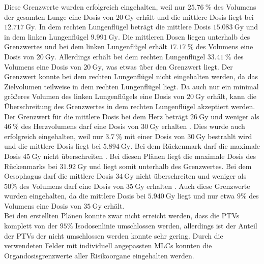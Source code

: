 Diese Grenzwerte wurden erfolgreich eingehalten, weil nur $\SI{25.76}{\percent}$ des Volumens der gesamten Lunge eine Dosis von $\SI{20}{\gray}$
erhält und die mittlere Dosis liegt bei $\SI{12.717}{\gray}$. In dem rechten Lungenflügel beträgt die mittlere Dosis $\SI{15.083}{\gray}$
und in dem linken Lungenflügel $\SI{9.991}{\gray}$. Die mittleren Dosen liegen unterhalb des Grenzwertes und bei dem linken Lungenflügel
erhält $\SI{17.17}{\percent}$ des Volumens eine Dosis von $\SI{20}{\gray}$. Allerdings erhält bei dem rechten Lungenflügel $\SI{33.41}{\percent}$
des Volumens eine Dosis von $\SI{20}{\gray}$, was etwas über den Grenzwert liegt. Der Grenzwert konnte bei dem rechten Lungenflügel
nicht eingehalten werden, da das Zielvolumen teilweise in dem rechten Lungenflügel liegt. Da auch nur ein minimal größeres Volumen des linken
Lungenflügels eine Dosis von $\SI{20}{\gray}$ erhält, kann die Überschreitung des Grenzwertes in dem rechten Lungenflügel akzeptiert werden.
Der Grenzwert für die mittlere Dosis bei dem Herz beträgt $\SI{26}{\gray}$ und weniger als $\SI{46}{\percent}$ des Herzvolumens darf
eine Dosis von $\SI{30}{\gray}$ erhalten \cite{grenz}. Dies wurde auch erfolgreich eingehalten, weil nur $\SI{3.7}{\percent}$ mit einer Dosis von
$\SI{30}{\gray}$ bestrahlt wird und die mittlere Dosis liegt bei $\SI{5.894}{\gray}$.
Bei dem Rückenmark darf die maximale Dosis $\SI{45}{\gray}$ nicht überschreiten \cite{grenz}.
Bei diesen Plänen liegt die maximale Dosis des Rückenmarks bei $\SI{31.92}{\gray}$ und liegt somit unterhalb des Grenzwertes.
Bei dem Oesophagus darf die mittlere Dosis $\SI{34}{\gray}$ nicht überschreiten und weniger als $50\%$ des Volumens darf eine Dosis von $\SI{35}{\gray}$
erhalten \cite{QUANTEC}. Auch diese Grenzwerte wurden eingehalten, da die mittlere Dosis bei $\SI{5.940}{\gray}$ liegt und nur etwa $9\%$ des Volumens eine
Dosis von $\SI{35}{\gray}$ erhält. \\

Bei den erstellten Plänen konnte zwar nicht erreicht werden, dass die PTVs komplett von der $95\%$ Isodosenlinie
umschlossen werden, allerdings ist der Anteil der PTVs der nicht umschlossen werden konnte sehr gering.
Durch die verwendeten Felder mit individuell angepassten MLCs konnten die Organdosisgrenzwerte aller Risikoorgane eingehalten werden.

